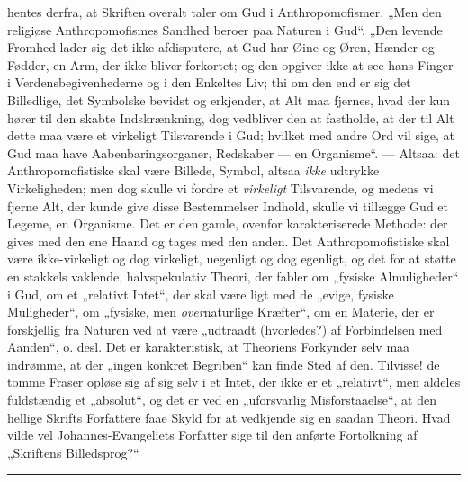 \documentclass[12pt,a4paper,openany]{book}
\newcommand{\opage}[1]{\marginnote{\footnotesize\textit{[#1]}}}
\begin{document}
hentes derfra, at Skriften overalt taler om Gud i Anthropomofismer.
„Men den religiøse Anthropomofismes Sandhed
beroer paa Naturen i Gud“. „Den levende Fromhed lader
sig det ikke afdisputere, at Gud har Øine og Øren, Hænder
og Fødder, en Arm, der ikke bliver forkortet; og den opgiver
ikke at see hans Finger i Verdensbegivenhederne og i den
Enkeltes Liv; thi om den end er sig det Billedlige, det Symbolske
bevidst og erkjender, at Alt maa fjernes, hvad der
kun hører til den skabte Indskrænkning, dog vedbliver den at
fastholde, at der til Alt dette maa være et virkeligt Tilsvarende
i Gud; hvilket med andre Ord vil sige, at Gud maa
have Aabenbaringsorganer, Redskaber --- en Organisme“. ---
Altsaa: det Anthropomofistiske skal være Billede, Symbol,
altsaa \emph{ikke} udtrykke Virkeligheden; men dog skulle vi fordre
et \emph{virkeligt} Tilsvarende, og medens vi fjerne Alt, der kunde
give disse Bestemmelser Indhold, skulle vi tillægge Gud et
Legeme, en Organisme. Det er den gamle, ovenfor karakteriserede
Methode: der gives med den ene Haand og tages
med den anden. Det Anthropomofistiske skal være ikke-virkeligt
og dog virkeligt, uegenligt og dog egenligt, og det for
at støtte en stakkels vaklende, halvspekulativ Theori, der fabler
om „fysiske Almuligheder“ i Gud, om et „relativt Intet“,
der skal være ligt med de „evige, fysiske Muligheder“, om
„fysiske, men \emph{over}naturlige Kræfter“, om en Materie, der
er forskjellig fra Naturen ved at være „udtraadt (hvorledes?)
af Forbindelsen med Aanden“, o. desl. Det er karakteristisk,
at Theoriens Forkynder selv maa indrømme, at der „ingen
konkret Begriben“ kan finde Sted af den. Tilvisse! de
\opage{453}tomme Fraser opløse sig af sig selv i et Intet, der ikke er
et „relativt“, men aldeles fuldstændig et „absolut“, og det er
ved en „uforsvarlig Misforstaaelse“, at den hellige Skrifts
Forfattere faae Skyld for at vedkjende sig en saadan Theori.
Hvad vilde vel Johannes-Evangeliets Forfatter sige til den
anførte Fortolkning af „Skriftens Billedsprog?“

\begin{center}\rule{1.8cm}{0.4pt}\end{center}
\end{document}
